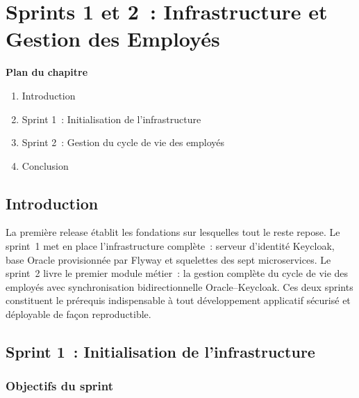 \chapter{Sprints 1 et 2~: Infrastructure et Gestion des Employés}

\noindent\textbf{Plan du chapitre}
\begin{enumerate}[nosep]
  \item Introduction
  \item Sprint 1~: Initialisation de l'infrastructure
  \item Sprint 2~: Gestion du cycle de vie des employés
  \item Conclusion
\end{enumerate}

\section{Introduction}

La première release établit les fondations sur lesquelles tout le reste repose.
Le sprint~1 met en place l'infrastructure complète~: serveur d'identité Keycloak,
base Oracle provisionnée par Flyway et squelettes des sept microservices. Le
sprint~2 livre le premier module métier~: la gestion complète du cycle de vie
des employés avec synchronisation bidirectionnelle Oracle--Keycloak. Ces deux
sprints constituent le prérequis indispensable à tout développement applicatif
sécurisé et déployable de façon reproductible.

\section{Sprint 1~: Initialisation de l'infrastructure}

\subsection{Objectifs du sprint}

